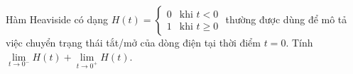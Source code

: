 \begin{ex}
Hàm Heaviside có dạng $H(t)=\begin{cases}0&\text{khi }t<0\\1&\text{khi }t\ge0\end{cases}$ thường được dùng để mô tả việc chuyển trạng thái tắt/mở của dòng điện tại thời điểm $t=0$. Tính $\lim\limits_{t\to0^-}H(t)+\lim\limits_{t\to0^+}H(t)$.
\end{ex}
